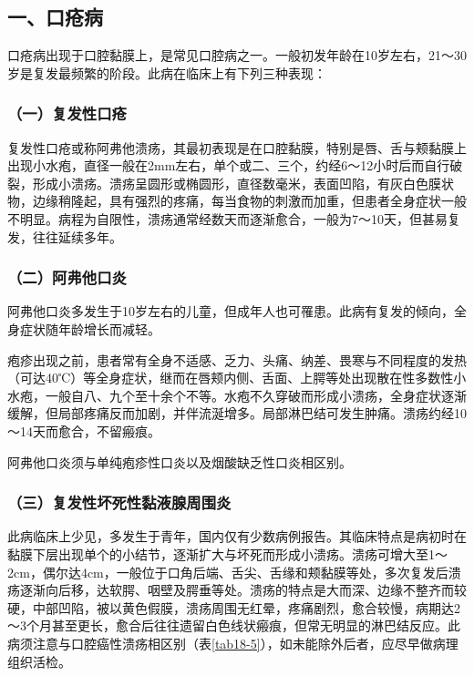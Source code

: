 \subsection{一、口疮病}

口疮病出现于口腔黏膜上，是常见口腔病之一。一般初发年龄在10岁左右，21～30岁是复发最频繁的阶段。此病在临床上有下列三种表现：

\subsubsection{（一）复发性口疮}

复发性口疮或称阿弗他溃疡，其最初表现是在口腔黏膜，特别是唇、舌与颊黏膜上出现小水疱，直径一般在2mm左右，单个或二、三个，约经6～12小时后而自行破裂，形成小溃疡。溃疡呈圆形或椭圆形，直径数毫米，表面凹陷，有灰白色膜状物，边缘稍隆起，具有强烈的疼痛，每当食物的刺激而加重，但患者全身症状一般不明显。病程为自限性，溃疡通常经数天而逐渐愈合，一般为7～10天，但甚易复发，往往延续多年。

\subsubsection{（二）阿弗他口炎}

阿弗他口炎多发生于10岁左右的儿童，但成年人也可罹患。此病有复发的倾向，全身症状随年龄增长而减轻。

疱疹出现之前，患者常有全身不适感、乏力、头痛、纳差、畏寒与不同程度的发热（可达40℃）等全身症状，继而在唇颊内侧、舌面、上腭等处出现散在性多数性小水疱，一般自八、九个至十余个不等。水疱不久穿破而形成小溃疡，全身症状逐渐缓解，但局部疼痛反而加剧，并伴流涎增多。局部淋巴结可发生肿痛。溃疡约经10～14天而愈合，不留瘢痕。

阿弗他口炎须与单纯疱疹性口炎以及烟酸缺乏性口炎相区别。

\subsubsection{（三）复发性坏死性黏液腺周围炎}

此病临床上少见，多发生于青年，国内仅有少数病例报告。其临床特点是病初时在黏膜下层出现单个的小结节，逐渐扩大与坏死而形成小溃疡。溃疡可增大至1～2cm，偶尔达4cm，一般位于口角后端、舌尖、舌缘和颊黏膜等处，多次复发后溃疡逐渐向后移，达软腭、咽壁及腭垂等处。溃疡的特点是大而深、边缘不整齐而较硬，中部凹陷，被以黄色假膜，溃疡周围无红晕，疼痛剧烈，愈合较慢，病期达2～3个月甚至更长，愈合后往往遗留白色线状瘢痕，但常无明显的淋巴结反应。此病须注意与口腔癌性溃疡相区别（表\ref{tab18-5}），如未能除外后者，应尽早做病理组织活检。

